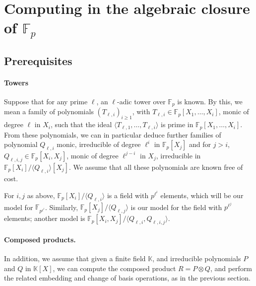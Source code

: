 \documentclass{sig-alternate}
\def\F {\ensuremath{\mathbb{F}}}
\def\K {\ensuremath{\mathbb{K}}}
\begin{document}

\section{Computing in the algebraic closure of $\F_p$}


\subsection{Prerequisites}

\paragraph{Towers}
Suppose that for any prime $\ell$, an $\ell$-adic tower over $\F_p$ is
known. By this, we mean a family of polynomials $(T_{\ell,i})_{i \ge
  1}$, with $T_{\ell,i} \in \F_p[X_1,\dots,X_i]$, monic of degree
$\ell$ in $X_i$, such that the ideal $\langle
T_{\ell,1},\dots,T_{\ell,i} \rangle$ is prime in
$\F_p[X_1,\dots,X_i]$. From these polynomials, we can in particular
deduce further families of polynomial $Q_{\ell,i}$ monic, irreducible
of degree $\ell^i$ in $\F_p[X_j]$ and for $j > i$, $Q_{\ell,i,j}
\in\F_p[X_i,X_j]$, monic of degree $\ell^{j-i}$ in $X_j$, irreducible
in $\F_p[X_i]/\langle Q_{\ell,i}\rangle[X_j]$. We assume that all
these polynomials are known free of cost.

For $i,j$ as above, $\F_p[X_i]/\langle Q_{\ell,i} \rangle$ is a field
with $p^{\ell^i}$ elements, which will be our model for
$\F_{p^{\ell^i}}$. Similarly, $\F_p[X_j]/\langle Q_{\ell,j}\rangle$ is
our model for the field with $p^{\ell^j}$ elements; another model is
$\F_p[X_i,X_j]/\langle Q_{\ell,i}, Q_{\ell,i,j}\rangle$.

\paragraph{Composed products.} In addition, we assume that given a finite field
$\K$, and irreducible polynomials $P$ and $Q$ in $\K[X]$, we can
compute the composed product $R = P \otimes Q$, and perform the
related embedding and change of basis operations, as in the previous
section.

\end{document}
